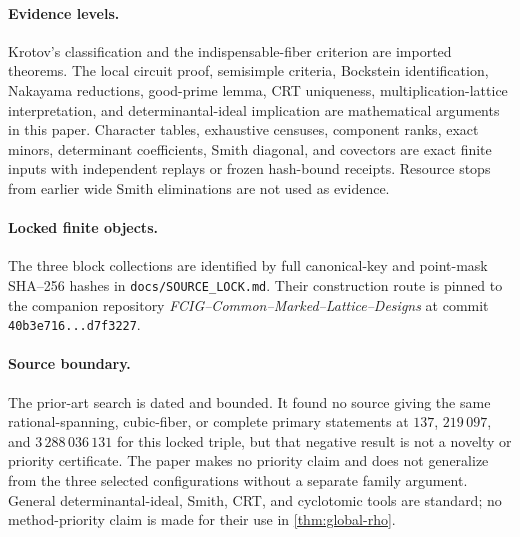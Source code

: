 \paragraph{Evidence levels.}
Krotov's classification and the indispensable-fiber criterion are imported
theorems.  The local circuit proof, semisimple criteria, Bockstein
identification, Nakayama reductions, good-prime lemma, CRT uniqueness,
multiplication-lattice interpretation, and determinantal-ideal implication
are mathematical arguments in this paper.  Character tables, exhaustive
censuses, component ranks, exact minors, determinant coefficients, Smith
diagonal, and covectors are exact finite inputs with independent replays or
frozen hash-bound receipts.  Resource stops from earlier wide Smith
eliminations are not used as evidence.

\paragraph{Locked finite objects.}
The three block collections are identified by full canonical-key and
point-mask SHA--256 hashes in \texttt{docs/SOURCE\_LOCK.md}.  Their
construction route is pinned to the companion repository
\emph{FCIG--Common--Marked--Lattice--Designs} at commit
\texttt{40b3e716...d7f3227}.

\paragraph{Source boundary.}
The prior-art search is dated and bounded.  It found no source giving the
same rational-spanning, cubic-fiber, or complete primary statements at
\(137\), \(219\,097\), and \(3\,288\,036\,131\) for this locked triple,
but that negative result is not a novelty or priority certificate.  The
paper makes no priority claim and does not generalize from the three
selected configurations without a separate family argument.  General
determinantal-ideal, Smith, CRT, and cyclotomic tools are standard; no
method-priority claim is made for their use in \cref{thm:global-rho}.
